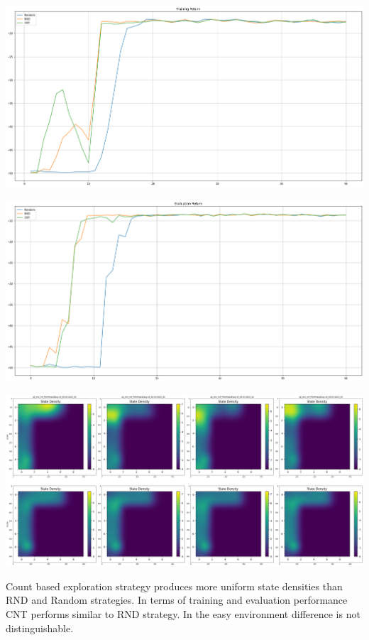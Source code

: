 \documentclass[11pt]{article}
\begin{document}
    \hspace*{-0.3in}
    \includegraphics[scale=0.30]{p1/q1-p2-cnt-easy-train}

    \hspace*{-0.6in}
    \includegraphics[scale=0.30]{p1/q1-p2-cnt-easy-eval}

    \hspace*{-0.6in}
    \includegraphics[scale=0.2]{p1/q1-p2-cnt-easy-state-density}

    Count based exploration strategy produces more uniform state densities than RND and Random strategies.
    In terms of training and evaluation performance CNT performs similar to RND strategy.
    In the easy environment difference is not distinguishable.
\end{document}
